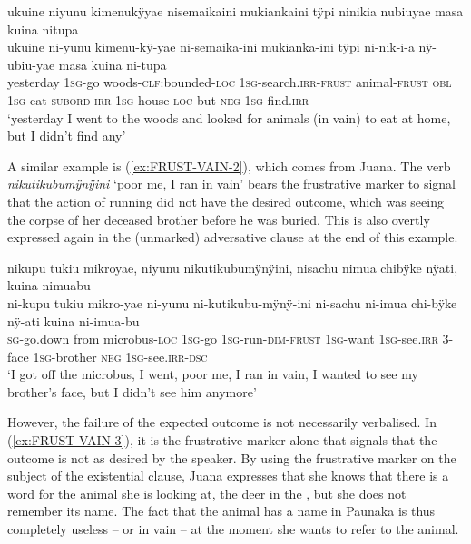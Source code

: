 \ea\label{ex:FRUST-VAIN-1}
\begingl 
\glpreamble ukuine niyunu kimenukÿyae nisemaikaini mukiankaini tÿpi ninikia nubiuyae masa kuina nitupa\\
\gla ukuine ni-yunu kimenu-kÿ-yae ni-semaika-ini mukianka-ini tÿpi ni-nik-i-a nÿ-ubiu-yae masa kuina ni-tupa\\ 
\glb yesterday 1\textsc{sg}-go woods-\textsc{clf}:bounded-\textsc{loc} 1\textsc{sg}-search.\textsc{irr}-\textsc{frust} animal-\textsc{frust} \textsc{obl} 1\textsc{sg}-eat-\textsc{subord}-\textsc{irr} 1\textsc{sg}-house-\textsc{loc} but \textsc{neg} 1\textsc{sg}-find.\textsc{irr}\\ 
\glft ‘yesterday I went to the woods and looked for animals (in vain) to eat at home, but I didn’t find any’\\ 
\endgl
\trailingcitation{[nxx-a630101g-1.62]}
\xe

A similar example is (\ref{ex:FRUST-VAIN-2}), which comes from Juana. The verb \textit{nikutikubumÿnÿini} ‘poor me, I ran in vain’ bears the frustrative marker to signal that the action of running did not have the desired outcome, which was seeing the corpse of her deceased brother before he was buried. This is also overtly expressed again in the (unmarked) adversative clause at the end of this example.

\ea\label{ex:FRUST-VAIN-2}
\begingl 
\glpreamble nikupu tukiu mikroyae, niyunu nikutikubumÿnÿini, nisachu nimua chibÿke nÿati, kuina nimuabu\\
\gla ni-kupu tukiu mikro-yae ni-yunu ni-kutikubu-mÿnÿ-ini ni-sachu ni-imua chi-bÿke nÿ-ati kuina ni-imua-bu\\ 
\textsc{sg}-go.down from microbus-\textsc{loc} 1\textsc{sg}-go 1\textsc{sg}-run-\textsc{dim}-\textsc{frust} 1\textsc{sg}-want 1\textsc{sg}-see.\textsc{irr} 3-face 1\textsc{sg}-brother \textsc{neg} 1\textsc{sg}-see.\textsc{irr}-\textsc{dsc}\\ 
\glft ‘I got off the microbus, I went, poor me, I ran in vain, I wanted to see my brother's face, but I didn't see him anymore’\\ 
\endgl
\trailingcitation{[jxx-p120430l-2.465]}
\xe

However, the failure of the expected outcome is not necessarily verbalised. In (\ref{ex:FRUST-VAIN-3}), it is the frustrative marker alone that signals that the outcome is not as desired by the speaker. By using the frustrative marker on the subject of the existential clause, Juana expresses that she knows that there is a word for the animal she is looking at, the deer in the , but she does not remember its name. The fact that the animal has a name in Paunaka is thus completely useless -- or in vain -- at the moment she wants to refer to the animal.


